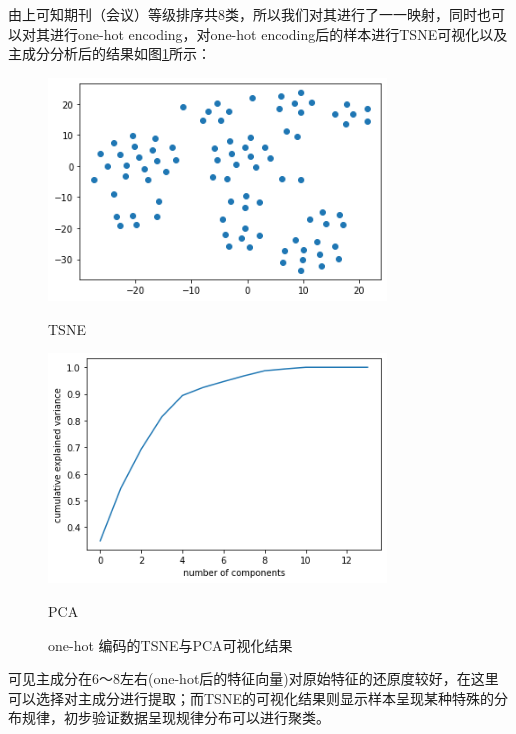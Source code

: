 由上可知期刊（会议）等级排序共8类，所以我们对其进行了一一映射，同时也可以对其进行one-hot encoding，对one-hot encoding后的样本进行TSNE可视化以及主成分分析后的结果如图\ref{TSNE-PCA-one-hot}所示：
\begin{figure}[htb]
    \vspace{13pt} %
    \begin{minipage}[htb]{0.5\linewidth}
        \centering
        \includegraphics[width=0.8\textwidth]{images/TSNE-one-hot.png}
        \caption{TSNE}
    \end{minipage}
    \begin{minipage}[htb]{0.5\linewidth}
        \centering
        \includegraphics[width=0.8\textwidth]{images/PCA-one-hot.png}
        \caption{PCA}
    \end{minipage}
    \caption{one-hot 编码的TSNE与PCA可视化结果}\label{TSNE-PCA-one-hot} %
\end{figure}
  




可见主成分在6～8左右(one-hot后的特征向量)对原始特征的还原度较好，在这里可以选择对主成分进行提取；而TSNE的可视化结果则显示样本呈现某种特殊的分布规律，初步验证数据呈现规律分布可以进行聚类。

